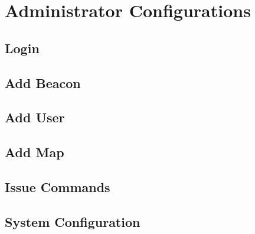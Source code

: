 

\setcounter{section}{3}
\section{Administrator Configurations}

\bigskip

\subsection{Login}
\subsection{Add Beacon}
\subsection{Add User}
\subsection{Add Map}
\subsection{Issue Commands}
\subsection{System Configuration}
